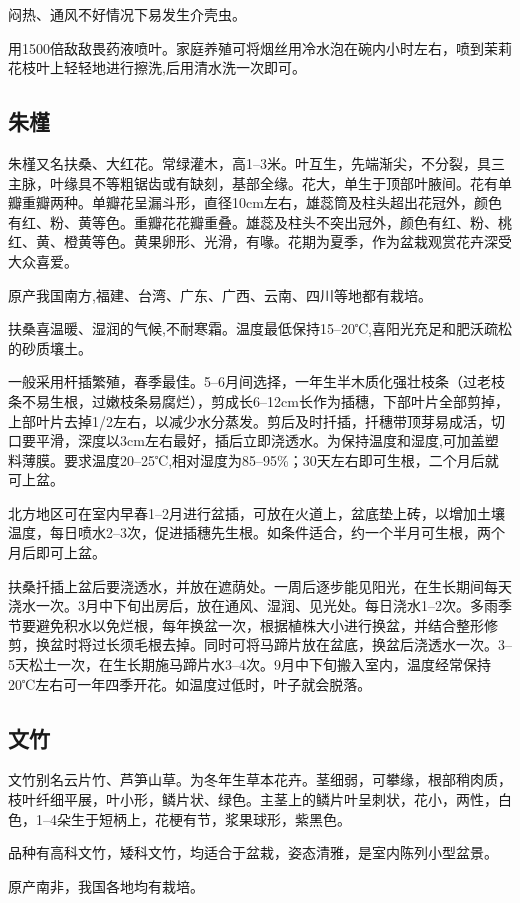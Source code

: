 \documentclass{ctexbook}
\begin{document}
闷热、通风不好情况下易发生介壳虫。

用1500倍敌敌畏药液喷叶。家庭养殖可将烟丝用冷水泡在碗内小时左右，喷到茉莉花枝叶上轻轻地进行擦洗,后用清水洗一次即可。
\subsection{朱槿}
朱槿又名扶桑、大红花。常绿灌木，高1--3米。叶互生，先端渐尖，不分裂，具三主脉，叶缘具不等粗锯齿或有缺刻，基部全缘。花大，单生于顶部叶腋间。花有单瓣重瓣两种。单瓣花呈漏斗形，直径10cm左右，雄蕊筒及柱头超出花冠外，颜色有红、粉、黄等色。重瓣花花瓣重叠。雄蕊及柱头不突出冠外，颜色有红、粉、桃红、黄、橙黄等色。黄果卵形、光滑，有喙。花期为夏季，作为盆栽观赏花卉深受大众喜爱。

原产我国南方,福建、台湾、广东、广西、云南、四川等地都有栽培。

扶桑喜温暖、湿润的气候,不耐寒霜。温度最低保持15--20℃,喜阳光充足和肥沃疏松的砂质壤土。

一般采用杆插繁殖，春季最佳。5--6月间选择，一年生半木质化强壮枝条（过老枝条不易生根，过嫩枝条易腐烂），剪成长6--12cm长作为插穗，下部叶片全部剪掉，上部叶片去掉1/2左右，以减少水分蒸发。剪后及时扦插，扦穗带顶芽易成活，切口要平滑，深度以3cm左右最好，插后立即浇透水。为保持温度和湿度,可加盖塑料薄膜。要求温度20--25℃,相对湿度为85--95\%；30天左右即可生根，二个月后就可上盆。

北方地区可在室内早春1--2月进行盆插，可放在火道上，盆底垫上砖，以增加土壤温度，每日喷水2--3次，促进插穗先生根。如条件适合，约一个半月可生根，两个月后即可上盆。

扶桑扦插上盆后要浇透水，并放在遮荫处。一周后逐步能见阳光，在生长期间每天浇水一次。3月中下旬出房后，放在通风、湿润、见光处。每日浇水1--2次。多雨季节要避免积水以免烂根，每年换盆一次，根据植株大小进行换盆，并结合整形修剪，换盆时将过长须毛根去掉。同时可将马蹄片放在盆底，换盆后浇透水一次。3--5天松土一次，在生长期施马蹄片水3--4次。9月中下旬搬入室内，温度经常保持20℃左右可一年四季开花。如温度过低时，叶子就会脱落。
\subsection{文竹}
文竹别名云片竹、芦笋山草。为冬年生草本花卉。茎细弱，可攀缘，根部稍肉质，枝叶纤细平展，叶小形，鳞片状、绿色。主茎上的鳞片叶呈刺状，花小，两性，白色，1--4朵生于短柄上，花梗有节，浆果球形，紫黑色。

品种有高科文竹，矮科文竹，均适合于盆栽，姿态清雅，是室内陈列小型盆景。

原产南非，我国各地均有栽培。
\end{document}
